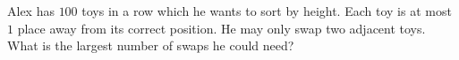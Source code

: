 Alex has $100$ toys in a row which he wants to sort by height. Each toy is at most $1$ place away from its correct position. He may only swap two adjacent toys. What is the largest number of swaps he could need?
